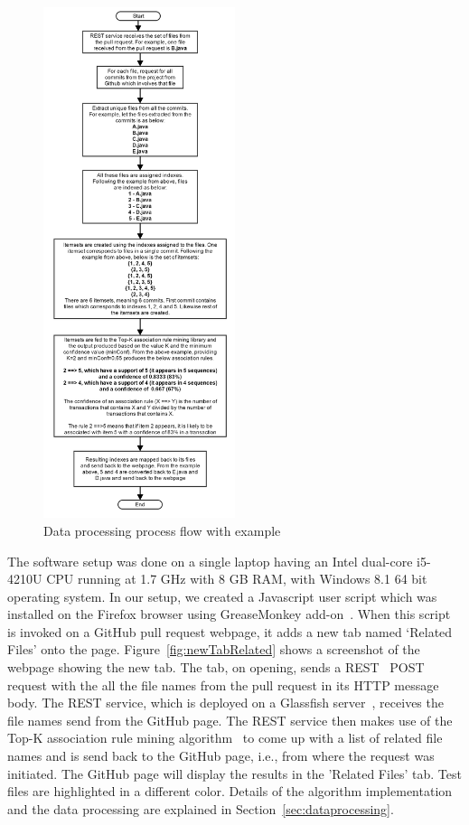 \begin{figure}[ht!]
\includegraphics[width=0.5\textwidth]{data_processing_spmf}
\caption{Data processing process flow with example}
\label{fig:data_processing_spmf}
\end{figure}

The software setup was done on a single laptop having an Intel dual-core i5-4210U CPU running at 1.7 GHz with 8 GB RAM, with Windows 8.1 64 bit operating system. In our setup, we created a Javascript user script which was installed on the Firefox browser using GreaseMonkey add-on~\cite{greasemonkey1,greasemonkey2}. When this script is invoked on a GitHub pull request webpage, it adds a new tab named `Related Files' onto the page. Figure~\ref{fig:newTabRelated} shows a screenshot of the webpage showing the new tab. The tab, on opening, sends a REST~\cite{rest} POST~\cite{post_http} request with the all the file names from the pull request in its HTTP message body. The REST service, which is deployed on a Glassfish server~\cite{glassfish}, receives the file names send from the GitHub page. The REST service then makes use of the Top-K association rule mining algorithm~\cite{fournier2012mining} to come up with a list of related file names and is send back to the GitHub page, i.e., from where the request was initiated. The GitHub page will display the results in the 'Related Files' tab. Test files are highlighted in a different color. Details of the algorithm implementation and the data processing are explained in Section~\ref{sec:dataprocessing}.

